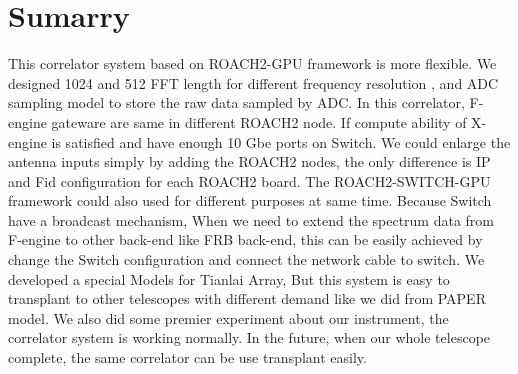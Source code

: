 \documentclass{ws-jai}
\begin{document}
\section{Sumarry}\label{sec:summary}	
This correlator system based on ROACH2-GPU framework is more flexible. We designed 1024 and 512 FFT length for different frequency resolution , and ADC sampling model to store the raw data sampled by ADC. In this correlator, F-engine gateware are same in different ROACH2 node. If  compute ability of X-engine is satisfied and have enough 10 Gbe ports on Switch. We could enlarge the antenna inputs simply by adding the ROACH2 nodes, the only difference is IP and Fid configuration for each ROACH2 board. The ROACH2-SWITCH-GPU framework could also used for different purposes at same time. Because Switch have a broadcast mechanism, When we need to extend the spectrum data from F-engine to other back-end like FRB back-end, this can be easily achieved by change the Switch configuration and connect the network cable to switch. We developed a special Models for Tianlai Array, But this system is easy to transplant to other telescopes with different demand like we did from PAPER model. We also did some premier experiment about our instrument, the correlator system is working normally. In the future, when our whole telescope complete, the same correlator can be use transplant easily. 




\end{document}
